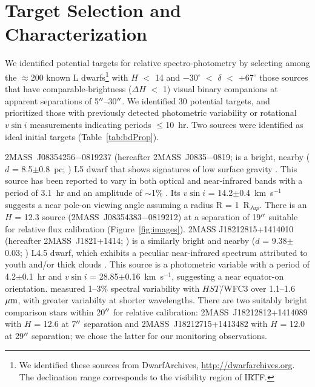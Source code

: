\documentclass[twocolumn]{aastex6}
\newcommand{\degree}{$^\circ$}
\newcommand{\kms}{km~s$^{-1}$}
\newcommand{\rjup}{R$_{Jup}$}
\newcommand{\sha}{2MASS~J0835$-$0819}
\newcommand{\shb}{2MASS~J1821+1414}
\begin{document}
\section{Target Selection and Characterization}\label{sec:targets}

We identified potential targets for relative spectro-photometry by selecting among the $\approx$200 known L dwarfs\footnote{We identified these sources from DwarfArchives,  \url{http://dwarfarchives.org}. The declination range corresponds to the visibility region of IRTF.} with $H$ $<$ 14 and $-$30{\degree}  $<$ $\delta$ $<$ +67{\degree} those sources that have comparable-brightness ($\Delta{H}$ $<$ 1) visual binary companions at apparent separations of 5$\mbox{$^{\prime\prime}$}$--30$\mbox{$^{\prime\prime}$}$. We identified 30 potential targets, and prioritized those with previously detected photometric variability or rotational $v\sin{i}$ measurements indicating periods $\leq$10~hr.  Two sources were identified as ideal initial targets (Table~\ref{tab:bdProp}).

2MASS~J08354256$-$0819237 (hereafter {\sha}; \citealt{2003AJ....126.2421C} is a bright, nearby ($d$ = 8.5$\pm$0.8~pc; \citealt{2012ApJ...752...56F}) L5 dwarf that shows signatures of low surface gravity \citep{2016ApJ...833...96L}. 
This source has been reported to vary in both optical and near-infrared bands with a period of 3.1~hr and an amplitude of $\sim$1\%  \citep{2004MNRAS.354..378K,2014A&A...566A.111W}.
Its $v\sin{i}$ = 14.2$\pm$0.4~{\kms} \citep{2010ApJ...723..684B} suggests a near pole-on viewing angle assuming a radius R = 1~{\rjup}.
There is an $H$ = 12.3 source (2MASS~J08354383$-$0819212) at a separation of 19$\mbox{$^{\prime\prime}$}$ suitable for relative flux calibration (Figure~\ref{fig:images}). 
2MASS J18212815+1414010 (hereafter {\shb}; \citealt{2008ApJ...686..528L}) is a similarly bright and nearby ($d$ = 9.38$\pm$0.03; \citealt{2016MNRAS.455..357S}) L4.5 dwarf, which exhibits a peculiar near-infrared spectrum attributed to youth and/or thick clouds \citep{2008ApJ...686..528L,2015ApJS..219...33G,2016ApJ...833...96L}.
This source is a photometric variable with a period of 4.2$\pm$0.1~hr \citep{2015ApJ...799..154M} and $v\sin{i}$ = 28.85$\pm$0.16~{\kms}, suggesting a near equator-on orientation.  \citet{2015ApJ...798L..13Y} measured 1--3\% spectral variability with $HST$/WFC3 over 1.1--1.6~$\mbox{$\mu$m}$, with greater variabilty at shorter wavelengths.
There are two suitably bright comparison stars within 20$\mbox{$^{\prime\prime}$}$ for relative calibration: 2MASS~J18212812+1414089 with $H$ = 12.6 at 7$\mbox{$^{\prime\prime}$}$ separation and 2MASS~J18212715+1413482 with $H$ = 12.0 at 29$\mbox{$^{\prime\prime}$}$ separation; we chose the latter for our monitoring observations.
\end{document}
